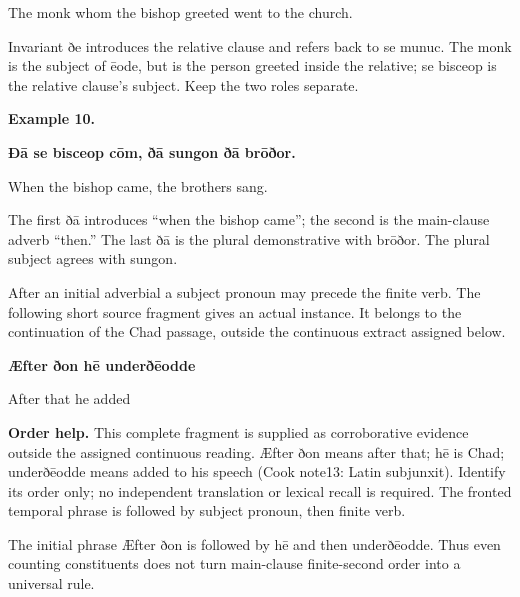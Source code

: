 The monk whom the bishop greeted went to the church.

Invariant ðe introduces the relative clause and refers back to se munuc. The monk is the subject of ēode, but is the person greeted inside the relative; se bisceop is the relative clause’s subject. Keep the two roles separate.

\textbf{Example 10.}

\textbf{Ðā se bisceop cōm, ðā sungon ðā brōðor.}

When the bishop came, the brothers sang.

The first ðā introduces “when the bishop came”; the second is the main-clause adverb “then.” The last ðā is the plural demonstrative with brōðor. The plural subject agrees with sungon.

After an initial adverbial a subject pronoun may precede the finite verb. The following short source fragment gives an actual instance. It belongs to the continuation of the Chad passage, outside the continuous extract assigned below.

\textbf{Æfter ðon hē underðēodde}

After that he added

\textbf{Order help.} This complete fragment is supplied as corroborative evidence outside the assigned continuous reading. Æfter ðon means after that; hē is Chad; underðēodde means added to his speech (Cook note13: Latin subjunxit). Identify its order only; no independent translation or lexical recall is required. The fronted temporal phrase is followed by subject pronoun, then finite verb.

The initial phrase Æfter ðon is followed by hē and then underðēodde. Thus even counting constituents does not turn main-clause finite-second order into a universal rule.

